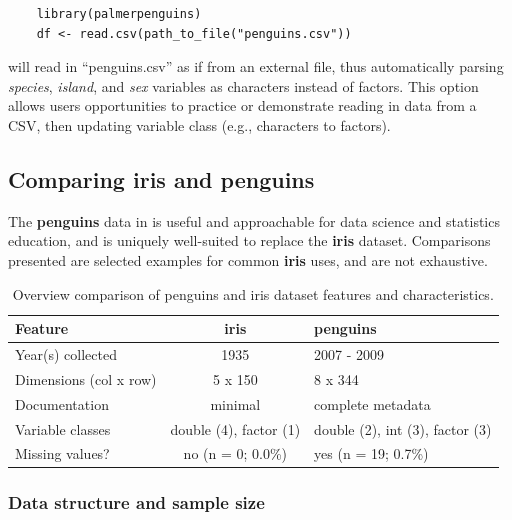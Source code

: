 \begin{verbatim}
    library(palmerpenguins)
    df <- read.csv(path_to_file("penguins.csv"))
\end{verbatim}

will read in ``penguins.csv'' as if from an external file, thus
automatically parsing \emph{species}, \emph{island}, and \emph{sex}
variables as characters instead of factors. This option allows users
opportunities to practice or demonstrate reading in data from a CSV,
then updating variable class (e.g., characters to factors).

\hypertarget{comparing-iris-and-penguins}{%
\subsection{\texorpdfstring{Comparing \textbf{iris} and
\textbf{penguins}}{Comparing iris and penguins}}\label{comparing-iris-and-penguins}}

The \textbf{penguins} data in  is useful and
approachable for data science and statistics education, and is uniquely
well-suited to replace the \textbf{iris} dataset. Comparisons presented
are selected examples for common \textbf{iris} uses, and are not
exhaustive.

\begin{Schunk}
\begin{table}

\caption{\label{tab:overview-tbl}Overview comparison of penguins and iris dataset features and characteristics.}
\centering
\begin{tabular}[t]{lcl}
\toprule
Feature & iris & penguins\\
\midrule
Year(s) collected & 1935 & 2007 - 2009\\
Dimensions (col x row) & 5 x 150 & 8 x 344\\
Documentation & minimal & complete metadata\\
Variable classes & double (4), factor (1) & double (2), int (3), factor (3)\\
Missing values? & no (n = 0; 0.0\%) & yes (n = 19; 0.7\%)\\
\bottomrule
\end{tabular}
\end{table}

\end{Schunk}

\hypertarget{data-structure-and-sample-size}{%
\subsubsection{Data structure and sample
size}\label{data-structure-and-sample-size}}

